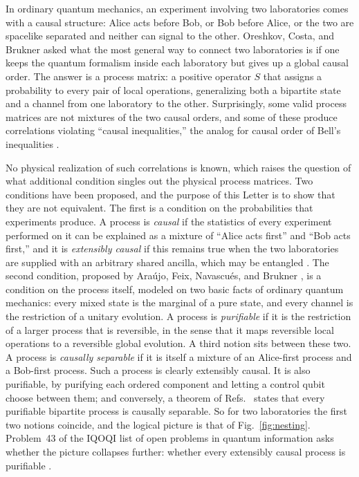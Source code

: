 \documentclass[aps,prl,reprint,superscriptaddress,nofootinbib,longbibliography,raggedbottom]{revtex4-2}
\begin{document}
In ordinary quantum mechanics, an experiment involving two laboratories comes
with a causal structure: Alice acts before Bob, or Bob before Alice, or the
two are spacelike separated and neither can signal to the other. Oreshkov,
Costa, and Brukner \cite{OCB} asked what the most general way to connect two
laboratories is if one keeps the quantum formalism inside each laboratory
but gives up a global causal order. The answer is a process matrix: a positive operator $S$ that assigns
a probability to every pair of local operations, generalizing both a
bipartite state and a channel from one laboratory to the other. Surprisingly, some valid process matrices are not mixtures of the two
causal orders, and some of these produce correlations violating
``causal inequalities,'' the analog for causal order of Bell's inequalities
\cite{OCB,Branciard}.

No physical realization of such correlations is known, which raises the
question of what additional condition singles out the physical process
matrices. Two conditions have been proposed, and the purpose of
this Letter is to show that they are not equivalent. The first is a
condition on the probabilities that experiments produce. A process is \emph{causal} if the statistics of
every experiment performed on it can be explained as a mixture of ``Alice
acts first'' and ``Bob acts first,'' and it is \emph{extensibly causal} if
this remains true when the two laboratories are supplied with an arbitrary
shared ancilla, which may be entangled \cite{OG}. The second condition,
proposed by Ara\'ujo, Feix, Navascu\'es, and Brukner \cite{AFNB}, is a
condition on the process itself, modeled on two basic facts of ordinary
quantum mechanics: every mixed state is the marginal of a pure state, and
every channel is the restriction of a unitary evolution. A process is
\emph{purifiable} if it is the restriction of a larger process that is
reversible, in the sense that it maps reversible local operations to a
reversible global evolution. A third notion sits between these two. A
process is \emph{causally separable} if it is itself a mixture of an
Alice-first process and a Bob-first process. Such a process is clearly
extensibly causal. It is also purifiable, by purifying each
ordered component and letting a control qubit choose between them; and
conversely, a theorem of Refs.~\cite{YQSM,BLO} states that every purifiable
bipartite process is causally separable. So for two laboratories the first
two notions coincide, and the logical picture is that of
Fig.~\ref{fig:nesting}. Problem~43 of the IQOQI list of open problems in
quantum information asks whether the picture collapses further: whether
every extensibly causal process is purifiable \cite{OQP}.
\end{document}

